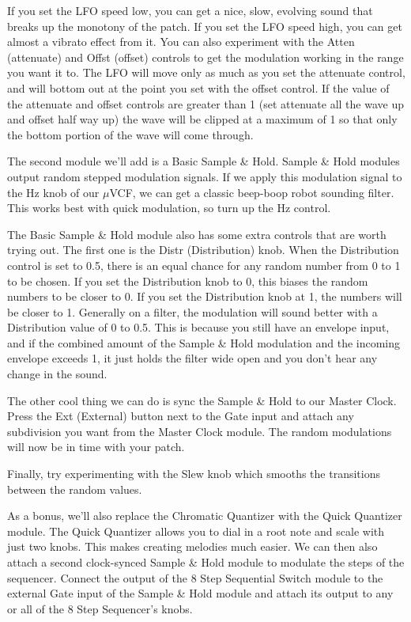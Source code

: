 \documentclass[11pt]{book}
\begin{document}
\begin{multicols*}{2}
If you set the LFO speed low, you can get a nice, slow, evolving sound that breaks up the monotony of the patch. If you set the LFO speed high, you can get almost a vibrato effect from it. You can also experiment with the Atten (attenuate) and Offst (offset) controls to get the modulation working in the range you want it to. The LFO will move only as much as you set the attenuate control, and will bottom out at the point you set with the offset control. If the value of the attenuate and offset controls are greater than 1 (set attenuate all the wave up and offset half way up) the wave will be clipped at a maximum of 1 so that only the bottom portion of the wave will come through.

The second module we'll add is a Basic Sample \& Hold. Sample \& Hold modules output random stepped modulation signals. If we apply this modulation signal to the Hz knob of our $\mu$VCF, we can get a classic beep-boop robot sounding filter. This works best with quick modulation, so turn up the Hz control.

The Basic Sample \& Hold module also has some extra controls that are worth trying out. The first one is the Distr (Distribution) knob. When the Distribution control is set to 0.5, there is an equal chance for any random number from 0 to 1 to be chosen. If you set the Distribution knob to 0, this biases the random numbers to be closer to 0. If you set the Distribution knob at 1, the numbers will be closer to 1. Generally on a filter, the modulation will sound better with a Distribution value of 0 to 0.5. This is because you still have an envelope input, and if the combined amount of the Sample \& Hold modulation and the incoming envelope exceeds 1, it just holds the filter wide open and you don't hear any change in the sound.

The other cool thing we can do is sync the Sample \& Hold to our Master Clock. Press the Ext (External) button next to the Gate input and attach any subdivision you want from the Master Clock module. The random modulations will now be in time with your patch.

Finally, try experimenting with the Slew knob which smooths the transitions between the random values. 

As a bonus, we'll also replace the Chromatic Quantizer with the Quick Quantizer module. The Quick Quantizer allows you to dial in a root note and scale with just two knobs. This makes creating melodies much easier. We can then also attach a second clock-synced Sample \& Hold module to modulate the steps of the sequencer. Connect the output of the 8 Step Sequential Switch module to the external Gate input of the Sample \& Hold module and attach its output to any or all of the 8 Step Sequencer's knobs.


\end{multicols*}
\end{document}
